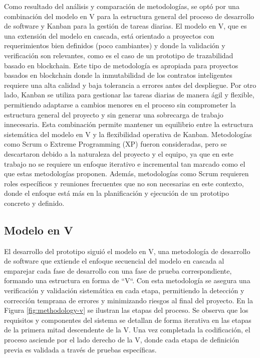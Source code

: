 Como resultado del análisis y comparación de metodologías, se optó por una combinación del modelo en V para la estructura general del proceso de desarrollo de software y Kanban para la gestión de tareas diarias. El modelo en V, que es una extensión del modelo en cascada, está orientado a proyectos con requerimientos bien definidos (poco cambiantes) y donde la validación y verificación son relevantes, como es el caso de un prototipo de trazabilidad basado en blockchain. Este tipo de metodología es apropiada para proyectos basados en blockchain donde la inmutabilidad de los contratos inteligentes requiere una alta calidad y baja tolerancia a errores antes del despliegue. Por otro lado, Kanban se utiliza para gestionar las tareas diarias de manera ágil y flexible, permitiendo adaptarse a cambios menores en el proceso sin comprometer la estructura general del proyecto y sin generar una sobrecarga de trabajo innecesaria. Esta combinación permite mantener un equilibrio entre la estructura sistemática del modelo en V y la flexibilidad operativa de Kanban. Metodologías como Scrum o Extreme Programming (XP) fueron consideradas, pero se descartaron debido a la naturaleza del proyecto y el equipo, ya que en este trabajo no se requiere un enfoque iterativo e incremental tan marcado como el que estas metodologías proponen. Además, metodologías como Scrum requieren roles específicos y reuniones frecuentes que no son necesarias en este contexto, donde el enfoque está más en la planificación y ejecución de un prototipo concreto y definido.

\subsection{Modelo en V}

El desarrollo del prototipo siguió el modelo en V, una metodología de desarrollo de software que extiende el enfoque secuencial del modelo en cascada al emparejar cada fase de desarrollo con una fase de prueba correspondiente, formando una estructura en forma de ``V``. Con esta metodología se asegura una verificación y validación sistemática en cada etapa, permitiendo la detección y corrección temprana de errores y minimizando riesgos al final del proyecto. En la Figura \ref{fig:methodology-v} se ilustran las etapas del proceso. Se observa que los requisitos y componentes del sistema se detallan de forma iterativa en las etapas de la primera mitad descendente de la V. Una vez completada la codificación, el proceso asciende por el lado derecho de la V, donde cada etapa de definición previa es validada a través de pruebas específicas.

